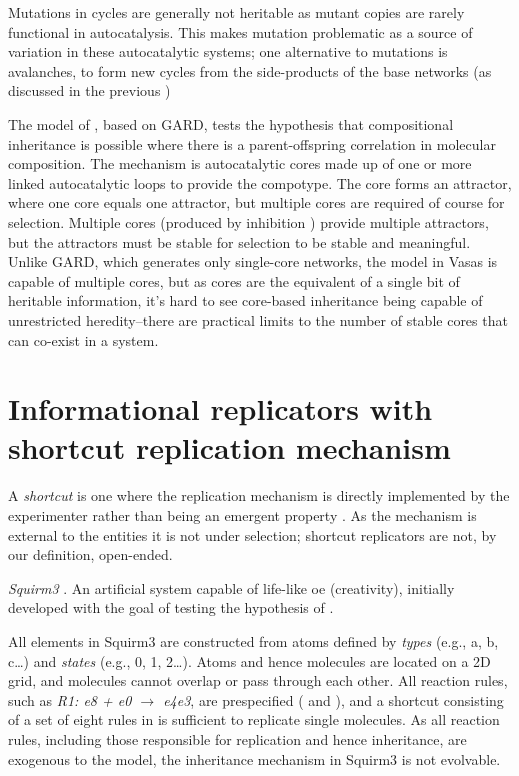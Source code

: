 Mutations in cycles \parencite{Vasas2012a} are generally not heritable as mutant copies are rarely functional in autocatalysis. This makes mutation problematic as a source of variation in these autocatalytic systems; one alternative to mutations is avalanches, to form new cycles from the side-products of the base networks (as discussed in the previous )


The model of \parencite{Vasas2015, Vasas2012, Vasas2012a}, based on GARD, tests the hypothesis that compositional inheritance is possible where there is a parent-offspring correlation in molecular composition. The mechanism is autocatalytic cores made up of one or more linked autocatalytic loops to provide the compotype. The core forms an attractor, where one core equals one attractor, but multiple cores are required of course for selection. Multiple cores (produced by inhibition \textcite{Vasas2012a}) provide multiple attractors, but the attractors must be stable for selection to be stable and meaningful. Unlike GARD, which generates only single-core networks, the model in Vasas is capable of multiple cores, but as cores are the equivalent of a single bit of heritable information, it's hard to see core-based inheritance being capable of unrestricted heredity--there are practical limits to the number of stable cores that can co-exist in a system. 

\section{Informational replicators with shortcut replication mechanism}

A \emph{shortcut} is one where the replication mechanism is directly implemented by the experimenter rather than being an emergent property \parencite{BanzhafBaumgaertnerBeslonEtAl2016}. As the mechanism is external to the entities it is not under selection; shortcut replicators are not, by our definition, open-ended.

\emph{Squirm3} \parencite{Hutton2007,Hutton2002}. An artificial system capable of life-like \gls{oe} (creativity), initially developed with the goal of testing the hypothesis of \textcite{Taylor2001} \parencite[p.341]{Hutton2002}.

All elements in Squirm3 are constructed from atoms defined by \emph{types} (e.g., a, b, c\dots) and \emph{states} (e.g., 0, 1, 2\dots). Atoms and hence molecules are located on a 2D grid, and molecules cannot overlap or pass through each other. All reaction rules, such as \emph{R1: e8 + e0 $\rightarrow$ e4e3}, are prespecified (\textcite[p.4]{Hutton2007} and \textcite[p.49]{Faulconbridge2011}), and a shortcut consisting of a set of eight rules in \textcite{Hutton2002} is sufficient to replicate single molecules. As all reaction rules, including those responsible for replication and hence inheritance, are exogenous to the model, the inheritance mechanism in Squirm3 is not evolvable. 

